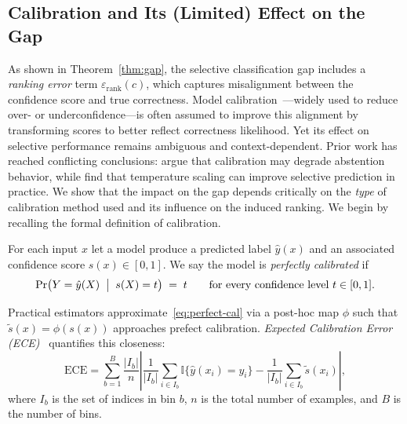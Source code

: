 \subsection{Calibration and Its (Limited) Effect on the Gap}
\label{sec:calibration-gap}

As shown in Theorem~\ref{thm:gap}, the selective classification gap includes a \emph{ranking error} term \(\varepsilon_{\text{rank}}(c)\), which captures misalignment between the confidence score and true correctness. Model calibration~\citep{niculescu2005predicting}—widely used to reduce over- or underconfidence—is often assumed to improve this alignment by transforming scores to better reflect correctness likelihood. Yet its effect on selective performance remains ambiguous and context-dependent. Prior work has reached conflicting conclusions: \citet{zhu2022rethinking} argue that calibration may degrade abstention behavior, while \citet{galil2023can} find that temperature scaling can improve selective prediction in practice. We show that the impact on the gap depends critically on the \emph{type} of calibration method used and its influence on the induced ranking. We begin by recalling the formal definition of calibration.

\begin{definition}
\label{def:calibration}
For each input \(x\) let a model produce a predicted label \(\hat y(x)\) and an associated confidence score \(s(x)\in[0,1]\). We say the model is \emph{perfectly calibrated} if
\begin{equation}
  \Pr\bigl(Y = \hat y(X)\;\bigm|\;s(X)=t\bigr) \;=\; t \qquad \text{for every confidence level}\ t\in[0,1].
  \label{eq:perfect-cal}
\end{equation}
\end{definition}

Practical estimators approximate~\eqref{eq:perfect-cal} via a post-hoc map \(\phi\) such that \(\tilde s(x)=\phi(s(x))\) approaches prefect calibration. \emph{Expected Calibration Error (ECE)}~\citep{naeini2015obtaining} quantifies this closeness:
\begin{equation}
  \text{ECE} = \sum_{b=1}^B \frac{|I_b|}{n}
  \left| \frac{1}{|I_b|} \sum_{i \in I_b} \mathbb{I}\{ \hat y(x_i) = y_i \}
         - \frac{1}{|I_b|} \sum_{i \in I_b} \tilde s(x_i) \right|,
  \label{eq:ece}
\end{equation}
where \(I_b\) is the set of indices in bin \(b\), \(n\) is the total number
of examples, and \(B\) is the number of bins.

